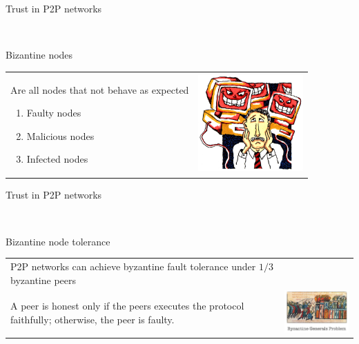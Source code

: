 \documentclass[12pt]{beamer}
\renewcommand{\frametitle}[1]{\vspace{0.2cm}\begin{huge}#1\end{huge}}
\renewcommand{\framesubtitle}[1]{\\ \vspace{0.4cm} \hspace{0.4cm}\begin{large}#1\end{large}}
\begin{document}
  \begin{frame}
  \frametitle{Trust in P2P networks}
  \framesubtitle{Bizantine nodes}
  \begin{table}
  \begin{tabular}{p{7cm}p{3cm}}
  Are all nodes that not behave as expected
  \begin{enumerate}
      \item Faulty nodes
      \item Malicious nodes
      \item Infected nodes
  \end{enumerate}
  &
  \vspace{1.5cm}
  \includegraphics[width=4cm]{../../presentacion/img/malicious}\\
  \end{tabular}
  \end{table}
  \end{frame}
  
  \begin{frame}
  \frametitle{Trust in P2P networks}
  \framesubtitle{Bizantine node tolerance}
  \begin{table}
  \begin{tabular}{p{7cm}p{3cm}}
    P2P networks can achieve byzantine fault tolerance under $1/3$ byzantine
    peers\\
    A peer is honest only if the peers executes the protocol faithfully;
    otherwise, the peer is faulty.
  &
  \vspace{1.5cm}
  \includegraphics[width=4cm]{../../presentacion/img/bizantine_generals_problem}\\
  \end{tabular}
  \end{table}
  \end{frame}
  
\end{document}
